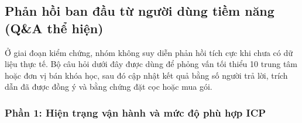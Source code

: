 \subsection{Phản hồi ban đầu từ người dùng tiềm năng (Q\&A thể hiện)}

Ở giai đoạn kiểm chứng, nhóm không suy diễn phản hồi tích cực khi chưa có dữ liệu
thực tế. Bộ câu hỏi dưới đây được dùng để phỏng vấn tối thiểu 10 trung tâm hoặc
đơn vị bán khóa học, sau đó cập nhật kết quả bằng số người trả lời, trích dẫn đã
được đồng ý và bằng chứng đặt cọc hoặc mua gói.

\subsubsection*{Phần 1: Hiện trạng vận hành và mức độ phù hợp ICP}

